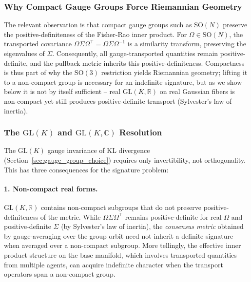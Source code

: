 \documentclass[11pt]{article}
\begin{document}
\subsubsection{Why Compact Gauge Groups Force Riemannian Geometry}

The relevant observation is that compact gauge groups such as $\mathrm{SO}(N)$ preserve the positive-definiteness of the Fisher-Rao inner product. For $\Omega \in \mathrm{SO}(N)$, the transported covariance $\Omega \Sigma \Omega^\top = \Omega \Sigma \Omega^{-1}$ is a similarity transform, preserving the eigenvalues of $\Sigma$. Consequently, all gauge-transported quantities remain positive-definite, and the pullback metric inherits this positive-definiteness. Compactness is thus part of why the $\mathrm{SO}(3)$ restriction yields Riemannian geometry; lifting it to a non-compact group is necessary for an indefinite signature, but as we show below it is not by itself sufficient -- real $\mathrm{GL}(K, \mathbb{R})$ on real Gaussian fibers is non-compact yet still produces positive-definite transport (Sylvester's law of inertia).

\subsubsection{The $\mathrm{GL}(K)$ and $\mathrm{GL}(K, \mathbb{C})$ Resolution}

The $\mathrm{GL}(K)$ gauge invariance of KL divergence (Section~\ref{sec:gauge_group_choice}) requires only invertibility, not orthogonality. This has three consequences for the signature problem:

\paragraph{1. Non-compact real forms.} $\mathrm{GL}(K, \mathbb{R})$ contains non-compact subgroups that do not preserve positive-definiteness of the metric. While $\Omega \Sigma \Omega^\top$ remains positive-definite for real $\Omega$ and positive-definite $\Sigma$ (by Sylvester's law of inertia), the \emph{consensus metric} obtained by gauge-averaging over the group orbit need not inherit a definite signature when averaged over a non-compact subgroup. More tellingly, the effective inner product structure on the base manifold, which involves transported quantities from multiple agents, can acquire indefinite character when the transport operators span a non-compact group.
\end{document}
